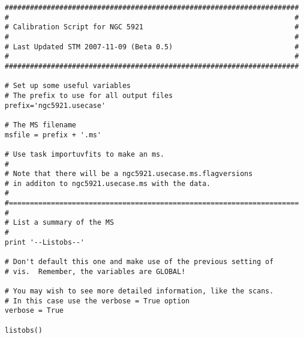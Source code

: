 \small
\begin{verbatim}
######################################################################
#                                                                    #
# Calibration Script for NGC 5921                                    #
#                                                                    #
# Last Updated STM 2007-11-09 (Beta 0.5)                             #
#                                                                    #
######################################################################

# Set up some useful variables
# The prefix to use for all output files
prefix='ngc5921.usecase'

# The MS filename
msfile = prefix + '.ms'

# Use task importuvfits to make an ms.
#
# Note that there will be a ngc5921.usecase.ms.flagversions
# in additon to ngc5921.usecase.ms with the data.
#
#=====================================================================
#
# List a summary of the MS
#
print '--Listobs--'

# Don't default this one and make use of the previous setting of
# vis.  Remember, the variables are GLOBAL!

# You may wish to see more detailed information, like the scans.
# In this case use the verbose = True option
verbose = True

listobs()


\end{verbatim}
